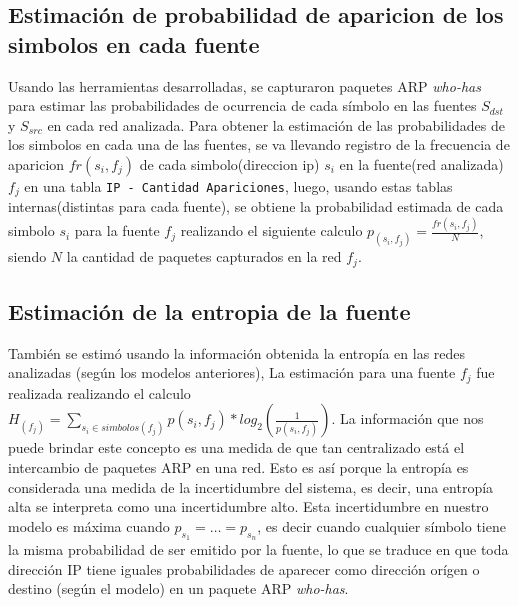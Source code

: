 \subsection{Estimaci\'on de probabilidad de aparicion de los simbolos en cada fuente}
\par Usando las herramientas desarrolladas, se capturaron paquetes ARP \textit{who-has} para estimar las probabilidades de ocurrencia de cada símbolo en las fuentes $S_{dst}$ y $S_{src}$ en cada red analizada.
Para obtener la estimaci\'on de las probabilidades de los simbolos en cada una de las fuentes, se va llevando registro de la frecuencia de aparicion $fr(s_i, f_j)$ de cada simbolo(direccion ip) $s_i$ en la fuente(red analizada)$f_j$ en una tabla \texttt{IP - Cantidad Apariciones}, luego, usando estas tablas internas(distintas para cada fuente), se obtiene la probabilidad estimada de cada simbolo $s_i$ para la fuente $f_j$ realizando el siguiente calculo $p_{(s_i, f_j)} = \frac{fr(s_i, f_j)}{N}$, siendo $N$ la cantidad de paquetes capturados en la red $f_j$.
\\
\subsection{Estimaci\'on de la entropia de la fuente}
También se estimó usando la información obtenida la entropía en las redes analizadas (según los modelos anteriores), La estimaci\'on para una fuente $f_j$ fue realizada realizando el calculo $H_{(f_j)} = \sum\limits_{s_i \in simbolos(f_j)} p(s_i, f_j) * log_2(\frac{1}{p(s_i,f_j)})$.
La información que nos puede brindar este concepto es una medida de que tan centralizado está el intercambio de paquetes ARP en una red. Esto es así porque la entropía es considerada una medida de la incertidumbre del sistema, es decir, una entropía alta se interpreta como una incertidumbre alto. Esta incertidumbre en nuestro modelo es máxima cuando $p_{s_1} = \dots = p_{s_n}$, es decir cuando cualquier símbolo tiene la misma probabilidad de ser emitido por la fuente, lo que se traduce en que toda dirección IP tiene iguales probabilidades de aparecer como dirección orígen o destino (según el modelo) en un paquete ARP \textit{who-has}.
 
